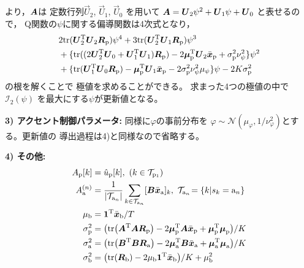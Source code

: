より，$\textit{\boldmath $A$}$は
定数行列$\Vec{U}_2$, $\Vec{U}_1$, $\Vec{U}_0$
を用いて
$\textit{\boldmath $A$}=\textit{\boldmath $U$}_2\psi^2+\textit{\boldmath $U$}_1\psi+\textit{\boldmath $U$}_0$
と表せるので，
Q関数の$\psi$に関する偏導関数は4次式となり，
\begin{align}
&2{\rm tr}(\textit{\boldmath $U$}_2^{\rm T}\textit{\boldmath $U$}_2\textit{\boldmath $R$}_{\rm p})\psi^4
+3{\rm tr}(\textit{\boldmath $U$}_2^{\rm T}\textit{\boldmath $U$}_1\textit{\boldmath $R$}_{\rm p})\psi^3
\nonumber\\
&+\{
{\rm tr}((2\textit{\boldmath $U$}_2^{\rm T}\textit{\boldmath $U$}_0+\textit{\boldmath $U$}_1^{\rm T}\textit{\boldmath $U$}_1)\textit{\boldmath $R$}_{\rm p})
-
2\textit{\boldmath $\mu$}_{\rm p}^{\rm T}
\textit{\boldmath $U$}_2\bar{\textit{\boldmath $x$}}_{\rm p}
+\sigma_{\rm p}^2\nu_{\psi}^2
\}\psi^2
\nonumber\\
&+\{
{\rm tr}(\textit{\boldmath $U$}_1^{\rm T}\textit{\boldmath $U$}_0\textit{\boldmath $R$}_{\rm p})
-\textit{\boldmath $\mu$}_{\rm p}^{\rm T}
\textit{\boldmath $U$}_1\bar{\textit{\boldmath $x$}}_{\rm p}
-2\sigma_{\rm p}^2\nu_{\psi}^2\mu_{\psi}
\}
\psi
-2K\sigma_{\rm p}^2
\nonumber
\end{align}
の根を解くことで
極値を求めることができる。
求まった4つの極値の中で$\mathcal{I}_{2}(\psi)$
を最大にする$\psi$が更新値となる。




\medskip
\noindent
{\bf 3) アクセント制御パラメータ:}
同様に$\varphi$の事前分布を
$\varphi
\sim\mathcal{N}(\mu_{\varphi},1/\nu_{\varphi}^2)
$とする。更新値の
導出過程は4)と同様なので省略する。


\medskip
\noindent
{\bf 4) その他:}~
\vspace{-0ex}
\begin{align}
A_{\rm p}[k]&=\hat{u}_{\rm p}[k],~(k\in\mathcal{T}_{{\rm p}_1})\\
A_{\rm a}^{(n)}&=
\frac{1}{|\mathcal{T}_{{\rm a}_{n}}|}
\sum_{k\in\mathcal{T}_{{\rm a}_n}}
[\textit{\boldmath $B$}\bar{\textit{\boldmath $x$}}_{\rm a}]_{k},~
\mathcal{T}_{{\rm a}_n}\!=\{k|s_k={\rm a}_n\}\\
\mu_{\rm b}&=
\textit{\boldmath $1$}^{\rm T}\bar{\textit{\boldmath $x$}}_{\rm b}/T\\
\sigma_{\rm p}^2&=
\big(
{\rm tr}\big(\textit{\boldmath $A$}^{\rm T}\textit{\boldmath $A$}\textit{\boldmath $R$}_{\rm p}\big)
-2\textit{\boldmath $\mu$}_{\rm p}^{\rm T}\textit{\boldmath $A$}\bar{\textit{\boldmath $x$}}_{\rm p}
+\textit{\boldmath $\mu$}_{\rm p}^{\rm T}\textit{\boldmath $\mu$}_{\rm p}
\big)/K\\
\sigma_{\rm a}^2&=
\big(
{\rm tr}\big(\textit{\boldmath $B$}^{\rm T}\textit{\boldmath $B$}\textit{\boldmath $R$}_{\rm a}\big)
-2\textit{\boldmath $\mu$}_{\rm a}^{\rm T}\textit{\boldmath $B$}\bar{\textit{\boldmath $x$}}_{\rm a}
+\textit{\boldmath $\mu$}_{\rm a}^{\rm T}\textit{\boldmath $\mu$}_{\rm a}
\big)/K\\
\sigma_{\rm b}^2&=
\big(
{\rm tr}(\textit{\boldmath $R$}_{\rm b})
-2{\mu}_{\rm b}\textit{\boldmath $1$}^{\rm T}\bar{\textit{\boldmath $x$}}_{\rm b}
\big)/K
+{\mu}_{\rm b}^2
\end{align}


\clearpage




